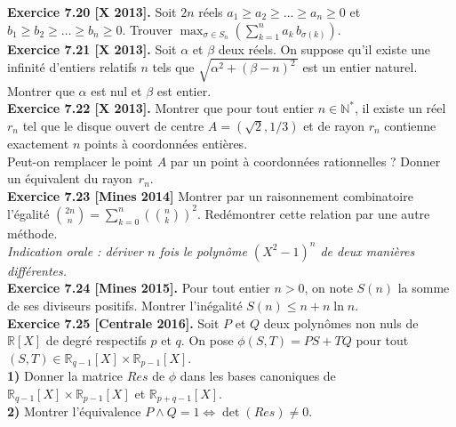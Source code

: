 \documentclass[a4paper,12pt,francais]{article}
\newcommand{\field}[1]{\mathbb{#1}}
\newcommand{\N}{\field{N}}
\newcommand{\R}{\field{R}}
\begin{document}
\noindent
{\bf Exercice 7.20 [X 2013].} Soit $2n$ réels $a_1 \geqslant a_2 \geqslant \dots \geqslant a_n \geqslant 0$ et 
$b_1 \geqslant b_2 \geqslant \dots \geqslant b_n \geqslant 0$. Trouver $\displaystyle \max_{\sigma \in S_n} \left({
\sum_{k=1}^n a_k \, b_{\sigma(k)} }\right)$.\\ 


\noindent
{\bf Exercice 7.21 [X 2013].} Soit $\alpha$ et $\beta$ deux réels. On suppose qu'il existe une infinité d'entiers relatifs $n$ tels que $\sqrt{\alpha^2+(\beta-n)^2\,}$ est un entier naturel. Montrer que $\alpha$ est nul et $\beta$ est entier.\\

\noindent
{\bf Exercice 7.22 [X 2013].} Montrer que pour tout entier $n \in \N^*$, il existe un réel $r_n$ tel que le disque ouvert
de centre $A=(\sqrt{2},1/3)$ et de rayon $r_n$ contienne exactement $n$ points à coordonnées
entières.\\
Peut-on remplacer le point $A$ par un point à coordonnées rationnelles ? Donner un équivalent du rayon~$r_n$.\\

\noindent %
{\bf Exercice 7.23 [Mines 2014]} Montrer par un raisonnement combinatoire l'égalité $\displaystyle \binom{2n}{n}= \sum_{k=0}^n \left({\binom{n}{k}}\right)^2$. Redémontrer cette relation par une autre méthode.\\
{\it Indication orale : dériver $n$ fois le polynôme $(X^2-1)^n$ de deux manières différentes.}\\

\noindent %
{\bf Exercice 7.24 [Mines 2015].} Pour tout entier $n>0$, on note $S(n)$ la somme de ses diviseurs positifs. Montrer l'inégalité $S(n) \leqslant n +n \ln n$.\\

\noindent %
{\bf Exercice 7.25 [Centrale 2016].}
Soit $P$ et $Q$ deux polynômes non nuls de $\R[X]$ de degré respectifs $p$ et $q$. On pose $\phi(S,T)=PS+TQ$ pour tout $(S,T)\in \R_{q-1}[X]\times \R_{p-1}[X]$.\\
{\bf 1)} Donner la matrice $Res$ de $\phi$ dans les bases canoniques de 
$\R_{q-1}[X]\times \R_{p-1}[X]$ et $\R_{p+q-1}[X]$.\\
{\bf 2)} Montrer l'équivalence $P \wedge Q=1 \Leftrightarrow  \det(Res) \neq 0$.\\
\end{document}
